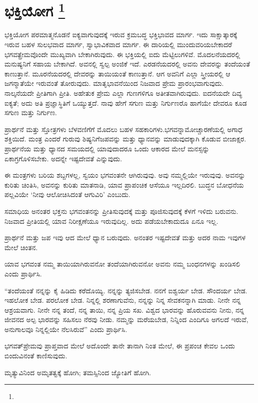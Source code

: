
\chapter[ಭಕ್ತಿಯೋಗ ]{ಭಕ್ತಿಯೋಗ \protect\footnote{}}

ಭಕ್ತಿಯೋಗ ಪರಮಾತ್ಮನೊಡನೆ ಐಕ್ಯವಾಗುವುದಕ್ಕೆ ಇರುವ ಕ್ರಮಬದ್ಧ ಭಕ್ತಿಭಾವದ ಮಾರ್ಗ. ಇದು ಸಾಕ್ಷಾತ್ಕಾರಕ್ಕೆ ಇರುವ ಬಹಳ ಸುಲಭವಾದ ಮಾರ್ಗ, ಸ್ವಾಭಾವಿಕವಾದ ಮಾರ್ಗ. ಈ ದಾರಿಯಲ್ಲಿ ಮುಂದುವರಿಯಬೇಕಾದರೆ ಭಗವತ್ಪ್ರೇಮವೊಂದೇ ಮುಖ್ಯವಾಗಿ ಬೇಕಾಗಿರುವುದು. ಈ ಭಕ್ತಿಯಲ್ಲಿ ಐದು ಮೆಟ್ಟಿಲುಗಳಿವೆ. ಮೊದಲನೆಯದರಲ್ಲಿ ಮನುಷ್ಯನಿಗೆ ಸಹಾಯ ಬೇಕಾಗಿದೆ. ಅವನಲ್ಲಿ ಸ್ವಲ್ಪ ಅಂಜಿಕೆ ಇದೆ. ಎರಡನೆಯದರಲ್ಲಿ ಅವನು ದೇವರನ್ನು ತಂದೆಯಂತೆ ಕಾಣುತ್ತಾನೆ. ಮೂರನೆಯದರಲ್ಲಿ ದೇವರನ್ನು ತಾಯಿಯಂತೆ ಕಾಣುತ್ತಾನೆ. ಆಗ ಅವನಿಗೆ ಎಲ್ಲಾ ಸ್ತ್ರೀಯರಲ್ಲಿ ಆ ಜಗನ್ಮಾತೆಯೇ ಇರುವಂತೆ ತೋರುವುದು. ಮಾತೃಭಾವನೆಯಿಂದ ನಿಜವಾದ ಪ್ರೇಮ ಪ್ರಾರಂಭವಾಗುವುದು. ನಾಲ್ಕನೆಯದೇ ಪ್ರೀತಿಗಾಗಿ ಪ್ರೀತಿ. ಅಹೇತುಕ ಪ್ರೇಮ ಎಲ್ಲಾ ಗುಣಗಳಿಗೂ ಅತೀತವಾಗಿರುವುದು. ಐದನೆಯದೇ ದಿವ್ಯ ಐಕ್ಯತೆ; ಅದು ಅತಿ ಪ್ರಜ್ಞಾಸ್ಥಿತಿಗೆ ಒಯ್ಯುತ್ತದೆ. ನಾವು ಹೇಗೆ ಸಗುಣ ಮತ್ತು ನಿರ್ಗುಣರೊ ಹಾಗೆಯೇ ದೇವರೂ ಕೂಡ ಸಗುಣ ಮತ್ತು ನಿರ್ಗುಣ.

ಪ್ರಾರ್ಥನೆ ಮತ್ತು ಸ್ತೋತ್ರಗಳು ಬೆಳವಣಿಗೆಗೆ ಮೊದಲು ಬಹಳ ಸಹಕಾರಿಗಳು.\break ಭಗವನ್ನಾಮೋಚ್ಚಾರಣೆಯಲ್ಲಿ ಅಗಾಧ ಶಕ್ತಿಯಿದೆ. ಮಂತ್ರ ಎಂದರೆ ಗುರುವು ಶಿಷ್ಯನಿಗೆ\break ಜಪವನ್ನು ಮತ್ತು ಧ್ಯಾನವನ್ನು ಮಾಡುವುದಕ್ಕಾಗಿ ಕೊಡುವ ಬೀಜಾಕ್ಷರ. ಪ್ರಾರ್ಥನೆಯ ಮತ್ತು ಧ್ಯಾನದ ಸಮಯದಲ್ಲಿ ಯಾವುದಾದರೂ ಒಂದು ಆಕಾರದ ಮೇಲೆ ಮನಸ್ಸನ್ನು ಏಕಾಗ್ರಗೊಳಿಸಬೇಕು. ಅದನ್ನೇ ಇಷ್ಟದೇವತೆ ಎನ್ನುವುದು.

ಈ ಮಂತ್ರಗಳು ಬರಿಯ ಶಬ್ದಗಳಲ್ಲ, ಸ್ವಯಂ ಭಗವಂತನೇ ಆಗಿರುವುವು. ಅವು ನಮ್ಮಲ್ಲಿಯೇ ಇರುವುವು. ಅವನನ್ನು ಕುರಿತು ಚಿಂತಿಸಿ, ಅವನನ್ನು ಕುರಿತು ಮಾತನಾಡಿ, ಯಾವ ಪ್ರಾಪಂಚಿಕ ಆಸೆಯೂ ಇಲ್ಲದಿರಲಿ. ಬುದ್ಧನ ಬೋಧನೆಯ ಪಲ್ಲವಿಯೇ ‘ನೀವು ಆಲೋಚಿಸಿದಂತೆ ಆಗುವಿರಿ’ ಎಂಬುದು.

ಸಮಾಧಿಯ ಅನಂತರ ಭಕ್ತನು ಭಗವಂತನನ್ನು ಪ್ರೀತಿಸುವುದಕ್ಕೆ ಮತ್ತು ಪೂಜಿಸುವುದಕ್ಕೆ ಕೆಳಗೆ ಇಳಿದು ಬರುವನು. ನಿಜವಾದ ಪ್ರೀತಿಯಲ್ಲಿ ಯಾವ ನಿರೀಕ್ಷಣೆಯೂ ಇರುವುದಿಲ್ಲ. ಅದು ಪಡೆಯಬೇಕಾದುದೂ ಏನೂ ಇಲ್ಲ.

ಪ್ರಾರ್ಥನೆ ಮತ್ತು ಜಪ ಇವು ಆದ ಮೇಲೆ ಧ್ಯಾನ ಬರುವುದು. ಅನಂತರ ಇಷ್ಟದೇವತೆ ಮತ್ತು ಅದರ ನಾಮ ಇವುಗಳ ಮೇಲೆ ಚಿಂತನ.

ಯಾವ ಭಗವಂತ ನಮ್ಮ ತಾಯಿಯಾಗಿರುವನೋ ತಂದೆಯಾಗಿರುವನೋ ಅವನು ನಮ್ಮ ಬಂಧನಗಳನ್ನು ಖಂಡಿಸಲಿ ಎಂದು ಪ್ರಾರ್ಥಿಸಿ.

“ತಂದೆಯಂತೆ ನನ್ನನ್ನು ಕೈ ಹಿಡಿದು ಕರೆದೊಯ್ಯಿ. ನನ್ನನ್ನು ತ್ಯಜಿಸಬೇಡ. ನನಗೆ ಐಶ್ವರ್ಯ ಬೇಡ. ಸೌಂದರ್ಯ ಬೇಡ. ಇಹಲೋಕ ಬೇಡ. ಪರಲೋಕ ಬೇಡ. ನಿನ್ನಲ್ಲಿ ಶರಣಾಗುವೆನು, ನನ್ನನ್ನು ನಿನ್ನ ಸೇವಕನನ್ನಾಗಿ ಮಾಡು. ನೀನೇ ನನ್ನ ಆಶ್ರಯವಾಗು. ನೀನೇ ನನ್ನ ತಂದೆ, ನನ್ನ ತಾಯಿ, ನನ್ನ ಪ್ರಿಯ ಸಖ. ವಿಶ್ವದ ಭಾರವನ್ನು ಹೊರುವವನು ನೀನು, ನನ್ನ ಜೀವನದ ಅಲ್ಪ ಭಾರವನ್ನು ಸಹಿಸಲು ನೆರವು ನೀಡು. ನಮ್ಮನ್ನು ಮರೆಯಬೇಡ, ನಿನ್ನಿಂದ ಎಂದಿಗೂ ಅಗಲದೆ ಇರುವೆ, ಅನುಗಾಲವೂ ನಿನ್ನಲ್ಲಿಯೇ ನೆಲಸಿರುವೆ” ಎಂದು ಪ್ರಾರ್ಥಿಸಿ.

ಭಗವತ್​ಪ್ರೇಮವು ಪ್ರಾಪ್ತವಾದ ಮೇಲೆ ಅದೊಂದೇ ತಾನೇ ತಾನಾಗಿ ನಿಂತ ಮೇಲೆ, ಈ ಪ್ರಪಂಚ ಕೇವಲ ಒಂದು ಬಿಂದುವಿನಂತೆ ಕಾಣಿಸುವುದು.

ಮೃತ್ಯುವಿನಿಂದ ಅಮೃತತ್ವಕ್ಕೆ ಹೋಗಿ; ತಮಸ್ಸಿನಿಂದ ಜ್ಯೋತಿಗೆ ಹೋಗಿ.

\vskip -0.5cm


